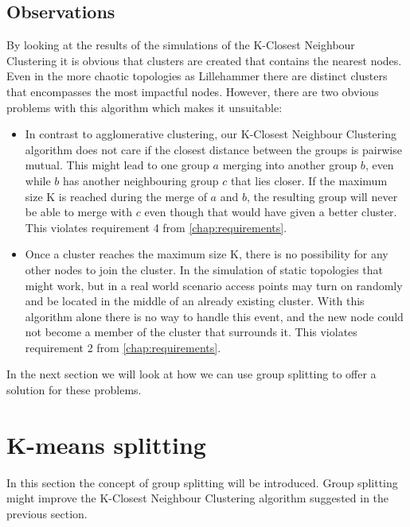 \subsection{Observations}
By looking at the results of the simulations of the K-Closest Neighbour Clustering it is obvious that clusters are created that contains the nearest nodes.
Even in the more chaotic topologies as Lillehammer there are distinct clusters that encompasses the most impactful nodes. However, there are two obvious problems with this algorithm
which makes it unsuitable:

\begin{itemize}
	\item In contrast to agglomerative clustering, our K-Closest Neighbour Clustering algorithm does not care if the closest distance between the groups is pairwise mutual. This
		might lead to one group $a$ merging into another group $b$, even while $b$ has another neighbouring group $c$ that lies closer. If the maximum size K is reached during the merge of
		$a$ and $b$,  the resulting group will never be able to merge with $c$ even though that would have given a better cluster. This violates requirement 4 from \ref{chap:requirements}. 
	\item Once a cluster reaches the maximum size K, there is no possibility for any other nodes to join the cluster.
		In the simulation of static topologies that might work, but in a real world scenario access points may turn on randomly and be located in the middle of an already existing cluster.
		With this algorithm alone there is no way to handle this event, and the new node could not become a member of the cluster that surrounds it. This violates requirement 2 from \ref{chap:requirements}.
\end{itemize}
In the next section we will look at how we can use group splitting to offer a solution for these problems.

\section{K-means splitting}
In this section the concept of group splitting will be introduced. Group splitting might improve the K-Closest Neighbour Clustering algorithm suggested in the previous section.

